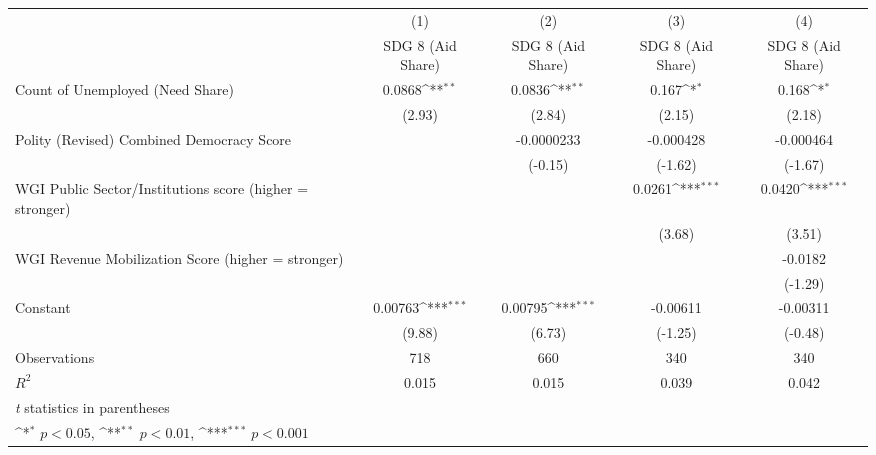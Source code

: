 {
\def\sym#1{\ifmmode^{#1}\else\(^{#1}\)\fi}
\begin{tabular}{l*{4}{c}}
\hline\hline
                &\multicolumn{1}{c}{(1)}&\multicolumn{1}{c}{(2)}&\multicolumn{1}{c}{(3)}&\multicolumn{1}{c}{(4)}\\
                &\multicolumn{1}{c}{SDG 8 (Aid Share)}&\multicolumn{1}{c}{SDG 8 (Aid Share)}&\multicolumn{1}{c}{SDG 8 (Aid Share)}&\multicolumn{1}{c}{SDG 8 (Aid Share)}\\
\hline
Count of Unemployed (Need Share)&   0.0868\sym{**} &   0.0836\sym{**} &    0.167\sym{*}  &    0.168\sym{*}  \\
                &   (2.93)         &   (2.84)         &   (2.15)         &   (2.18)         \\
[1em]
Polity (Revised) Combined Democracy Score&                  &-0.0000233         &-0.000428         &-0.000464         \\
                &                  &  (-0.15)         &  (-1.62)         &  (-1.67)         \\
[1em]
WGI Public Sector/Institutions score (higher = stronger)&                  &                  &   0.0261\sym{***}&   0.0420\sym{***}\\
                &                  &                  &   (3.68)         &   (3.51)         \\
[1em]
WGI Revenue Mobilization Score (higher = stronger)&                  &                  &                  &  -0.0182         \\
                &                  &                  &                  &  (-1.29)         \\
[1em]
Constant        &  0.00763\sym{***}&  0.00795\sym{***}& -0.00611         & -0.00311         \\
                &   (9.88)         &   (6.73)         &  (-1.25)         &  (-0.48)         \\
\hline
Observations    &      718         &      660         &      340         &      340         \\
\(R^{2}\)       &    0.015         &    0.015         &    0.039         &    0.042         \\
\hline\hline
\multicolumn{5}{l}{\footnotesize \textit{t} statistics in parentheses}\\
\multicolumn{5}{l}{\footnotesize \sym{*} \(p<0.05\), \sym{**} \(p<0.01\), \sym{***} \(p<0.001\)}\\
\end{tabular}
}
